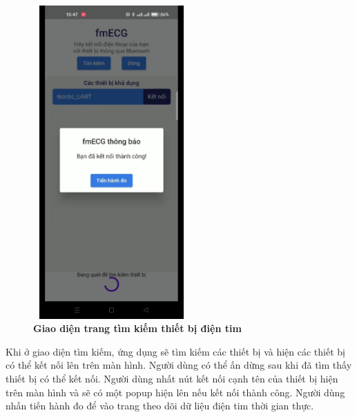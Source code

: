 \begin{figure}[H]
  \centering
  \includegraphics[width=6cm,height=12cm]{Images/mobile_app/demo/demo_connected_device.jpg}
  \caption[Giao diện trang tìm kiếm thiết bị điện tim]{\bfseries \fontsize{12pt}{0pt}\selectfont Giao diện trang tìm kiếm thiết bị điện tim}
  \label{demo_finding_bluetooth}
\end{figure}

Khi ở giao diện tìm kiếm, ứng dụng sẽ tìm kiếm các thiết bị và hiện các thiết bị có thể kết nối lên trên màn hình. Người dùng có thể ấn dừng
sau khi đã tìm thấy thiết bị có thể kết nối. Người dùng nhất nút kết nối cạnh tên của thiết bị hiện trên màn hình và sẽ có một
popup hiện lên nếu kết nối thành công. Người dùng nhấn tiến hành đo để vào trang theo dõi dữ liệu điện tim thời gian thực.

